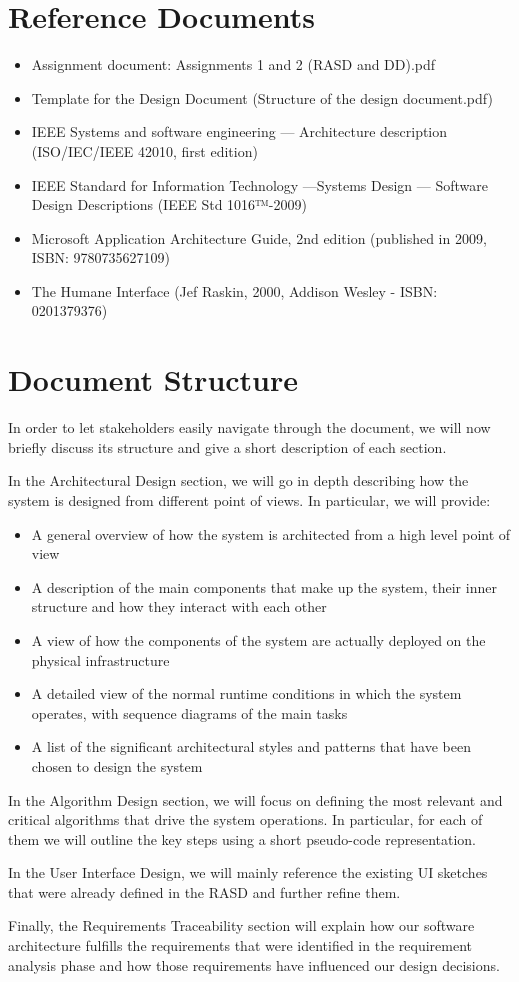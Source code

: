 \section{Reference Documents}
\begin{itemize}
	\item Assignment document: Assignments 1 and 2 (RASD and DD).pdf
	\item Template for the Design Document (Structure of the design document.pdf)
 	\item IEEE Systems and software engineering — Architecture description (ISO/IEC/IEEE 42010, first edition)
 	\item IEEE Standard for Information Technology —Systems Design — Software Design Descriptions (IEEE Std 1016™-2009)
 	\item Microsoft Application Architecture Guide, 2nd edition (published in 2009, ISBN: 9780735627109)
 	\item The Humane Interface (Jef Raskin, 2000, Addison Wesley - ISBN: 0201379376)
\end{itemize} 
 
\section{Document Structure}
In order to let stakeholders easily navigate through the document, we will now briefly discuss its structure and give a short description of each section.

In the Architectural Design section, we will go in depth describing how the system is designed from different point of views. In particular, we will provide: 
	\begin{itemize}
	\item A general overview of how the system is architected from a high level point of view
	\item A description of the main components that make up the system, their inner structure and how they interact with each other
	\item A view of how the components of the system are actually deployed on the physical infrastructure 
	\item A detailed view of the normal runtime conditions in which the system operates, with sequence diagrams of the main tasks
	\item A list of the significant architectural styles and patterns that have been chosen to design the system
	\end{itemize}
	
In the Algorithm Design section, we will focus on defining the most relevant and critical algorithms that drive the system operations. In particular, for each of them we will outline the key steps using a short pseudo-code representation.

In the User Interface Design, we will mainly reference the existing UI sketches that were already defined in the RASD and further refine them. 

Finally, the Requirements Traceability section will explain how our software architecture fulfills the requirements that were identified in the requirement analysis phase and how those requirements have influenced our design decisions. 
